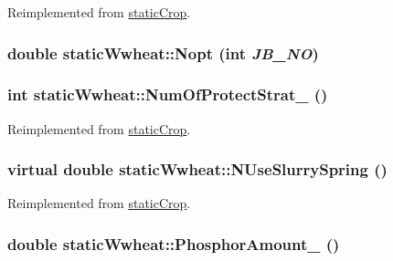 Reimplemented from \hyperlink{classstatic_crop_a32b69ed138beaed150efa74d18e82d8e}{staticCrop}.\hypertarget{classstatic_wwheat_ad969c3d0aba84277d7b0d4a881c66e56}{
\subsubsection[{Nopt}]{\setlength{\rightskip}{0pt plus 5cm}double staticWwheat::Nopt (int {\em JB\_\-NO})}}
\label{classstatic_wwheat_ad969c3d0aba84277d7b0d4a881c66e56}
\hypertarget{classstatic_wwheat_ab3b506b81bbf6bee0b5993a5d1e82e0f}{
\subsubsection[{NumOfProtectStrat\_\-}]{\setlength{\rightskip}{0pt plus 5cm}int staticWwheat::NumOfProtectStrat\_\- ()}}
\label{classstatic_wwheat_ab3b506b81bbf6bee0b5993a5d1e82e0f}


Reimplemented from \hyperlink{classstatic_crop_a4d3d767f569f48eb68ffa76822302467}{staticCrop}.\hypertarget{classstatic_wwheat_a5376e77c08e26a7a57ee1a1ba02095e2}{
\subsubsection[{NUseSlurrySpring}]{\setlength{\rightskip}{0pt plus 5cm}virtual double staticWwheat::NUseSlurrySpring ()}}
\label{classstatic_wwheat_a5376e77c08e26a7a57ee1a1ba02095e2}


Reimplemented from \hyperlink{classstatic_crop_ae7d21ab4afc8d8355d231566e8d87b1b}{staticCrop}.\hypertarget{classstatic_wwheat_a01fccbd4041ab0eb454ec7df73f3d87c}{
\subsubsection[{PhosphorAmount\_\-}]{\setlength{\rightskip}{0pt plus 5cm}double staticWwheat::PhosphorAmount\_\- ()}}
\label{classstatic_wwheat_a01fccbd4041ab0eb454ec7df73f3d87c}


